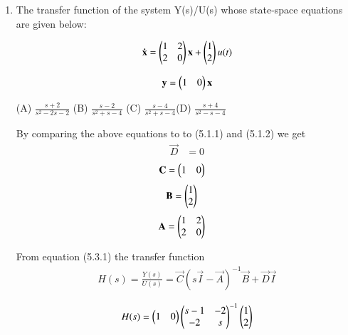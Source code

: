\begin{enumerate}[label=\thesubsection.\arabic*.,ref=\thesubsection.\theenumi]

\item The transfer function of the system Y(s)/U(s) whose state-space equations are given below:






\begin{align}
    \mathbf{\dot x } = \begin{pmatrix} 1&2\\ 2&0\end{pmatrix} \mathbf{x} + \begin{pmatrix} 1 \\2\end{pmatrix}u(t)   
\end{align}

\begin{align}
    \mathbf{y} = \begin{pmatrix} 1&0\end{pmatrix}\mathbf{x}
\end{align}



(A) \(\frac{s + 2}{s^2 - 2s - 2}\)  (B) \(\frac{s - 2}{s^2 + s - 4}\)  (C) \(\frac{s - 4}{s^2 + s - 4}\)(D) \(\frac{s + 4}{s^2 - s - 4}\)




\solution By comparing the above equations to to (5.1.1) and (5.1.2) we get
\begin{align}
    \Vec{D} &= 0
\end{align}
\begin{align}
    \mathbf{C} &= \begin{pmatrix}1&0\end{pmatrix}
\end{align}
\begin{align}
    \mathbf{B} &= \begin{pmatrix}1\\2\end{pmatrix}
\end{align}
\begin{align}
    \mathbf{A} &= \begin{pmatrix}1&2\\2&0\end{pmatrix}
\end{align}

From equation (5.3.1) the transfer function
\begin{align}
    H(s) = \frac{Y(s)}{U(s)} = \vec{C}(s\vec{I} - \vec{A})^{-1} \vec{B} + \vec{D}\vec{I}
\end{align}

\begin{align}
    H(s) = \begin{pmatrix}1&0\end{pmatrix}\begin{pmatrix} s-1&-2\\ -2&s\end{pmatrix}^{-1}\begin{pmatrix} 1\\2\end{pmatrix}
\end{align}


\end{enumerate}
